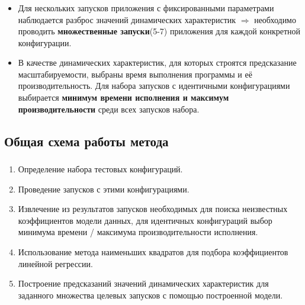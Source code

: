 \documentclass[unicode, t, 11pt]{beamer}%
\begin{document}
			\begin{frame}
				\frametitle{\insertsection}
	 			\framesubtitle{\insertsubsection}
	 			\begin{itemize}[label=\(\bullet\)]
					\item Для нескольких запусков приложения с фиксированными параметрами наблюдается разброс значений динамических характеристик \(\Rightarrow\) необходимо проводить \textbf{множественные запуски}(5-7) приложения для каждой конкретной конфигурации.
					\item В качестве динамических характеристик, для которых строятся предсказание масштабируемости, выбраны время выполнения программы и её производительность. Для набора запусков с идентичными конфигурациями выбирается \textbf{минимум времени исполнения и максимум производительности} среди всех запусков набора.
				\end{itemize}
			\end{frame}
		\subsection{Общая схема работы метода}
		\begin{frame}
			\frametitle{\insertsection}
	 		\framesubtitle{\insertsubsection}
	 		\begin{enumerate}[label=\arabic*)]
				\item Определение набора тестовых конфигураций.
				\item Проведение запусков с этими конфигурациями.
				\item Извлечение из результатов запусков необходимых для поиска неизвестных коэффициентов модели данных, для идентичных конфигураций выбор минимума времени / максимума производительности исполнения.
				\item Использование метода наименьших квадратов для подбора коэффициентов линейной регрессии.
				\item Построение предсказаний значений динамических характеристик для заданного множества целевых запусков с помощью построенной модели.
			\end{enumerate}
		\end{frame}
\end{document}
